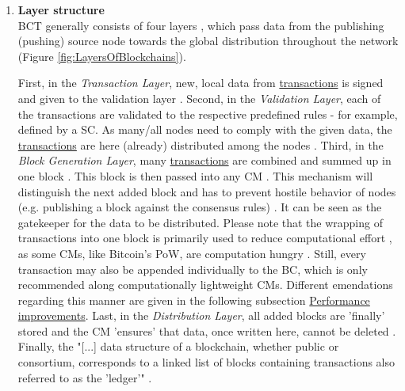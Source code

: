 \begin{enumerate}
	\item \textbf{Layer structure} \\
	\gls{BCT} generally consists of four layers \cite[181]{Oliveira.2019},
	which pass data from the publishing (pushing) source node towards the global distribution throughout the network (Figure \ref{fig:LayersOfBlockchains}).
	\begin{figure}[!b]
	\end{figure}
	First, in the \textit{Transaction Layer}, new, local data from \hyperref[def_TransactionsAndSC]{transactions} is signed and given to the validation layer \cite[181]{Oliveira.2019}.
	Second, in the \textit{Validation Layer},
	each of the transactions are validated to the respective predefined rules \cite[181]{Oliveira.2019} - for example, defined by a \gls{SC}.
	As many/all nodes need to comply with the given data, the \hyperref[def_TransactionsAndSC]{transactions} are here (already) distributed among the nodes \cite[181]{Oliveira.2019}.
	\label{sec:SmartContract}
	Third, in the \textit{Block Generation Layer}, many \hyperref[def_TransactionsAndSC]{transactions} are combined and summed up in one block \cite[181]{Oliveira.2019}.
	This block is then passed into any \gls{CM} \cite[181]{Oliveira.2019}.
	This mechanism will distinguish the next added block and has to prevent hostile behavior of nodes (e.g. publishing a block against the consensus rules) \cite[54]{Dib.2018}.
	It can be seen as the gatekeeper for the data to be distributed.
	Please note that the wrapping of transactions into one block is primarily used to reduce computational effort \cite[1204]{Kim.2018},
	as some \gls{CM}s, like  Bitcoin's \gls{PoW}, are computation hungry \cite[11008]{Liu.2018}.
	Still, every transaction may also be appended individually to the \gls{BC}, which is only recommended along computationally lightweight \gls{CM}s.
	Different emendations regarding this manner are given in the following subsection \hyperref[sec:PerformanceImprovements]{Performance improvements}.
	Last, in the \textit{Distribution Layer}, all added blocks are 'finally' stored and the \gls{CM} 'ensures' that data,
	once written here, cannot be deleted \cite[182]{Oliveira.2019}. \\
	Finally, the "[...] data structure of a blockchain, whether public or consortium,
	corresponds to a linked list of blocks containing transactions also referred to as the 'ledger'" \cite[52]{Dib.2018}.


\end{enumerate}
